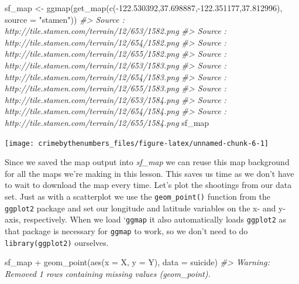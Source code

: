 \documentclass[
]{krantz}
\makeatletter
\newenvironment{Shaded}{\begin{snugshade}}{\end{snugshade}}
\newcommand{\AttributeTok}[1]{\textcolor[rgb]{0.61,0.61,0.61}{#1}}
\newcommand{\CommentTok}[1]{\textcolor[rgb]{0.37,0.37,0.37}{\textit{#1}}}
\newcommand{\FloatTok}[1]{\textcolor[rgb]{0.06,0.06,0.06}{#1}}
\newcommand{\FunctionTok}[1]{\textcolor[rgb]{0,0,0}{#1}}
\newcommand{\NormalTok}[1]{#1}
\newcommand{\OtherTok}[1]{\textcolor[rgb]{0.37,0.37,0.37}{#1}}
\newcommand{\SpecialCharTok}[1]{\textcolor[rgb]{0,0,0}{#1}}
\newcommand{\StringTok}[1]{\textcolor[rgb]{0.5,0.5,0.5}{#1}}
\newenvironment{kframe}{%
\medskip{}
\setlength{\fboxsep}{.8em}
 \def\at@end@of@kframe{}%
 \ifinner\ifhmode%
  \def\at@end@of@kframe{\end{minipage}}%
  \begin{minipage}{\columnwidth}%
 \fi\fi%
 \def\FrameCommand##1{\hskip\@totalleftmargin \hskip-\fboxsep
 \colorbox{shadecolor}{##1}\hskip-\fboxsep
     \hskip-\linewidth \hskip-\@totalleftmargin \hskip\columnwidth}%
 \MakeFramed {\advance\hsize-\width
   \@totalleftmargin\z@ \linewidth\hsize
   \@setminipage}}%
 {\par\unskip\endMakeFramed%
 \at@end@of@kframe}
\renewenvironment{Shaded}{\begin{kframe}}{\end{kframe}}
\makeatother
\begin{document}
\begin{Shaded}
\begin{Highlighting}[]
\NormalTok{sf\_map }\OtherTok{\textless{}{-}} \FunctionTok{ggmap}\NormalTok{(}\FunctionTok{get\_map}\NormalTok{(}\FunctionTok{c}\NormalTok{(}\SpecialCharTok{{-}}\FloatTok{122.530392}\NormalTok{,}\FloatTok{37.698887}\NormalTok{,}\SpecialCharTok{{-}}\FloatTok{122.351177}\NormalTok{,}\FloatTok{37.812996}\NormalTok{), }
                            \AttributeTok{source =} \StringTok{"stamen"}\NormalTok{))}
\CommentTok{\#\textgreater{} Source : http://tile.stamen.com/terrain/12/653/1582.png}
\CommentTok{\#\textgreater{} Source : http://tile.stamen.com/terrain/12/654/1582.png}
\CommentTok{\#\textgreater{} Source : http://tile.stamen.com/terrain/12/655/1582.png}
\CommentTok{\#\textgreater{} Source : http://tile.stamen.com/terrain/12/653/1583.png}
\CommentTok{\#\textgreater{} Source : http://tile.stamen.com/terrain/12/654/1583.png}
\CommentTok{\#\textgreater{} Source : http://tile.stamen.com/terrain/12/655/1583.png}
\CommentTok{\#\textgreater{} Source : http://tile.stamen.com/terrain/12/653/1584.png}
\CommentTok{\#\textgreater{} Source : http://tile.stamen.com/terrain/12/654/1584.png}
\CommentTok{\#\textgreater{} Source : http://tile.stamen.com/terrain/12/655/1584.png}
\NormalTok{sf\_map}
\end{Highlighting}
\end{Shaded}

\begin{center}\texttt{[image: crimebythenumbers\_files/figure-latex/unnamed-chunk-6-1]} \end{center}

Since we saved the map output into \emph{sf\_map} we can reuse this map background for all the maps we're making in this lesson. This saves us time as we don't have to wait to download the map every time. Let's plot the shootings from our data set. Just as with a scatterplot we use the \texttt{geom\_point()} function from the \texttt{ggplot2} package and set our longitude and latitude variables on the x- and y-axis, respectively. When we load `\texttt{ggmap} it also automatically loads \texttt{ggplot2} as that package is necessary for \texttt{ggmap} to work, so we don't need to do \texttt{library(ggplot2)} ourselves.

\begin{Shaded}
\begin{Highlighting}[]
\NormalTok{sf\_map }\SpecialCharTok{+}
  \FunctionTok{geom\_point}\NormalTok{(}\FunctionTok{aes}\NormalTok{(}\AttributeTok{x =}\NormalTok{ X, }\AttributeTok{y =}\NormalTok{ Y),}
             \AttributeTok{data  =}\NormalTok{ suicide)}
\CommentTok{\#\textgreater{} Warning: Removed 1 rows containing missing values (geom\_point).}
\end{Highlighting}
\end{Shaded}
\end{document}
